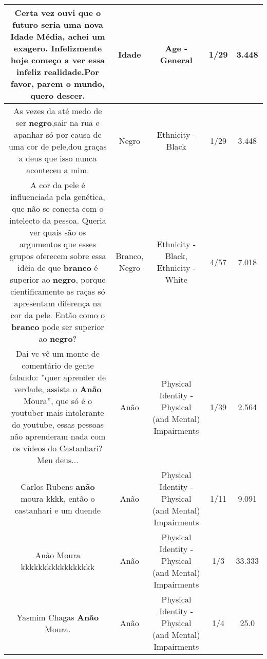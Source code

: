 \documentclass[11pt]{article}
\newlength\mylength
\begin{document}
\begin{center}
\begin{longtable}{|C{.65\mylength}|C{.30\mylength}|C{.12\mylength}|C{.12\mylength}|C{.12\mylength}|}
  \small Certa vez ouvi que o futuro seria uma nova \textbf{Idade} Média, achei um exagero. Infelizmente hoje começo a ver essa infeliz realidade.Por favor, parem o mundo, quero descer.\normalsize   & Idade & Age - General & 1/29 & 3.448 \\  \hline
  \small As vezes da até medo de ser \textbf{negro},sair na rua e apanhar só por causa de uma cor de pele,dou graças a deus que isso nunca aconteceu a mim.\normalsize   & Negro & Ethnicity - Black & 1/29 & 3.448 \\  \hline
  \small A cor da pele é influenciada pela genética, que não se conecta com o intelecto da pessoa. Queria ver quais são os argumentos que esses grupos oferecem sobre essa idéia de que \textbf{branco} é superior ao \textbf{negro}, porque cientificamente as raças só apresentam diferença na cor da pele. Então como o \textbf{branco} pode ser superior ao \textbf{negro}?\normalsize   & Branco, Negro & Ethnicity - Black, Ethnicity - White & 4/57 & 7.018 \\  \hline
  \small Dai vc vê um monte de comentário de gente falando: ''quer aprender de verdade, assista o \textbf{Anão} Moura'', que só é o youtuber mais intolerante do youtube,  essas pessoas não aprenderam nada com os vídeos do Castanhari? Meu deus...\normalsize   & Anão & Physical Identity - Physical (and Mental) Impairments & 1/39 & 2.564 \\  \hline
  \small Carlos Rubens \textbf{anão} moura kkkk, então o castanhari e um duende\normalsize   & Anão & Physical Identity - Physical (and Mental) Impairments & 1/11 & 9.091 \\  \hline
  \small Anão Moura kkkkkkkkkkkkkkkkk\normalsize   & Anão & Physical Identity - Physical (and Mental) Impairments & 1/3 & 33.333 \\  \hline
  \small Yasmim Chagas \textbf{Anão} Moura.\normalsize   & Anão & Physical Identity - Physical (and Mental) Impairments & 1/4 & 25.0 \\  \hline

\end{longtable}
\end{center}
\end{document}
